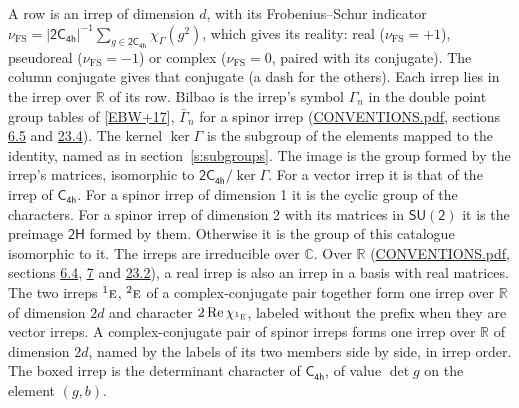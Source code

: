 \documentclass[10pt,a4paper]{article}
\numberwithin{equation}{section}
\newcommand{\grp}[1]{\mathsf{#1}}
\newcommand{\irr}[1]{\text{\normalfont\scshape #1}}
\newcommand{\conjpair}[1]{{}^{#1}}
\newcommand{\irchar}[1]{\chi_{#1}}
\newcommand{\fsind}{\nu_{\mathrm{FS}}}
\begin{document}
\leavevmode\label{n:index.frobenius}\label{n:head.irrep}\label{n:head.reality}A row is an irrep of dimension $d$, with its Frobenius--Schur indicator $\fsind = |\grp{2C_{4h}}|^{-1}\allowbreak\sum_{g\in\grp{2C_{4h}}}\irchar{\Gamma}(g^2)$, which gives its reality: real ($\fsind = +1$), pseudoreal ($\fsind = -1$) or complex ($\fsind = 0$, paired with its conjugate). \label{n:head.conjugate}The column conjugate gives that conjugate (a dash for the others). \label{n:head.over.real}Each irrep lies in the irrep over $\mathbb{R}$ of its row. \label{n:head.bilbao}\label{n:irrep.alias.gamma}Bilbao is the irrep's symbol $\Gamma_n$ in the double point group tables of [\href{../../../REFERENCES.pdf\#ref.EBW+17}{EBW+17}], $\bar{\Gamma}_n$ for a spinor irrep (\href{../../CONVENTIONS.pdf}{CONVENTIONS.pdf}, sections \href{../../../rotation/CONVENTIONS.pdf\#conv.6.5}{6.5} and \href{../../CONVENTIONS.pdf\#conv.23.4}{23.4}). \label{n:head.kernel}The kernel $\ker\Gamma$ is the subgroup of the elements mapped to the identity, named as in section~\ref{s:subgroups}. \label{n:head.image}The image is the group formed by the irrep's matrices, isomorphic to $\grp{2C_{4h}}/\ker\Gamma$. For a vector irrep it is that of the irrep of \href{../../../rotation/data/pdf/C4h.pdf}{$\grp{C_{4h}}$}. For a spinor irrep of dimension 1 it is the cyclic group of the characters. For a spinor irrep of dimension 2 with its matrices in $\grp{SU(2)}$ it is the preimage $\grp{2H}$ formed by them. Otherwise it is the group of this catalogue isomorphic to it. The irreps are irreducible over $\mathbb{C}$. Over $\mathbb{R}$ (\href{../../CONVENTIONS.pdf}{CONVENTIONS.pdf}, sections \href{../../../rotation/CONVENTIONS.pdf\#conv.6.4}{6.4}, \href{../../../rotation/CONVENTIONS.pdf\#conv.7}{7} and \href{../../CONVENTIONS.pdf\#conv.23.2}{23.2}), a real irrep is also an irrep in a basis with real matrices. The two irreps $\conjpair{1}\irr{e}$, $\conjpair{2}\irr{e}$ of a complex-conjugate pair together form one irrep over $\mathbb{R}$ of dimension $2d$ and character $2\operatorname{Re}\irchar{\conjpair{1}\irr{e}}$, labeled without the prefix when they are vector irreps. A complex-conjugate pair of spinor irreps forms one irrep over $\mathbb{R}$ of dimension $2d$, named by the labels of its two members side by side, in irrep order. \label{n:mark.determinant}The boxed irrep is the determinant character of \href{../../../rotation/data/pdf/C4h.pdf}{$\grp{C_{4h}}$}, of value $\det g$ on the element $(g, b)$.
\setlength{\emergencystretch}{2em}\par\setlength{\emergencystretch}{0pt}
\end{document}
